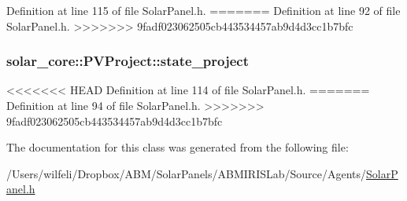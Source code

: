 Definition at line 115 of file Solar\+Panel.\+h.
=======
Definition at line 92 of file Solar\+Panel.\+h.
>>>>>>> 9fadf023062505cb443534457ab9d4d3cc1b7bfc

\hypertarget{classsolar__core_1_1_p_v_project_ab25a22c1202f2314a55dc9a759922183}{}
\subsubsection[{state\+\_\+project}]{ solar\+\_\+core\+::\+P\+V\+Project\+::state\+\_\+project}\label{classsolar__core_1_1_p_v_project_ab25a22c1202f2314a55dc9a759922183}


<<<<<<< HEAD
Definition at line 114 of file Solar\+Panel.\+h.
=======
Definition at line 94 of file Solar\+Panel.\+h.
>>>>>>> 9fadf023062505cb443534457ab9d4d3cc1b7bfc



The documentation for this class was generated from the following file\+:\begin{DoxyCompactItemize}
\item 
/\+Users/wilfeli/\+Dropbox/\+A\+B\+M/\+Solar\+Panels/\+A\+B\+M\+I\+R\+I\+S\+Lab/\+Source/\+Agents/\hyperlink{_solar_panel_8h}{Solar\+Panel.\+h}\end{DoxyCompactItemize}
